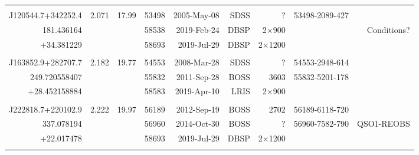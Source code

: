 \documentclass[a4paper,fleqn,usenatbib]{mnras}
\begin{document}
\begin{table*}
\begin{tabular}{r  r  r r r   r r r r}
 \hline 
                                       &                &               &            &                              &                   &                             &  & \\
   J120544.7+342252.4   & 2.071     &   17.99   & 53498 & 2005-May-08   & SDSS             & ?                          & 53498-2089-427  & \\
          181.436164           &                &               & 58538 & 2019-Feb-24     & DBSP            &  2$\times$900    &                               &  Conditions? \\
         +34.381229           &                &               & 58693 & 2019-Jul-29      & DBSP            &  2$\times$1200   &                                &   \\
                                       &                &               &              &                           &                   &                             &  & \\
   J163852.9+282707.7   & 2.182     &   19.77    & 54553 & 2008-Mar-28    & SDSS             & ?                          & 54553-2948-614  & \\
      249.720558407	       &               &              & 55832  & 2011-Sep-28     & BOSS            &   3603                  & 55832-5201-178  & \\
       +28.452158884        &               &              & 58583 & 2019-Apr-10        & LRIS              &  2$\times$900    &   & \\
                                       &                &               &              &                           &                   &                             &  & \\
    J222818.7+220102.9   & 2.222     & 19.97    & 56189 & 2012-Sep-19     & BOSS             &  2702               & 56189-6118-720   & \\
        337.078194              &              &              & 56960 & 2014-Oct-30    & BOSS             & ?                         & 56960-7582-790     & QSO1-REOBS \\ 
        +22.017478                                &               &             & 58693 & 2019-Jul-29      & DBSP              & 2$\times$1200  &       &    \\
                                       &                &               &            &                             &                   &                              &  & \\

\end{tabular}
\end{table*}
\end{document}
